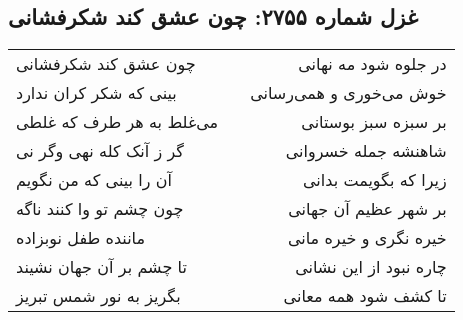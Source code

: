 \begin{center}
\section*{غزل شماره ۲۷۵۵: چون عشق کند شکرفشانی}
\label{sec:2755}
\begin{longtable}{l p{0.5cm} r}
چون عشق کند شکرفشانی
&&
در جلوه شود مه نهانی
\\
بینی که شکر کران ندارد
&&
خوش می‌خوری و همی‌رسانی
\\
می‌غلط به هر طرف که غلطی
&&
بر سبزه سبز بوستانی
\\
گر ز آنک کله نهی وگر نی
&&
شاهنشه جمله خسروانی
\\
آن را بینی که من نگویم
&&
زیرا که بگویمت بدانی
\\
چون چشم تو وا کنند ناگه
&&
بر شهر عظیم آن جهانی
\\
ماننده طفل نوبزاده
&&
خیره نگری و خیره مانی
\\
تا چشم بر آن جهان نشیند
&&
چاره نبود از این نشانی
\\
بگریز به نور شمس تبریز
&&
تا کشف شود همه معانی
\\
\end{longtable}
\end{center}

